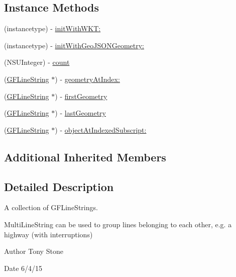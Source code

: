 \subsection*{Instance Methods}
\begin{DoxyCompactItemize}
\item 
(instancetype) -\/ \hyperlink{interface_g_f_multi_line_string_a23cca8dc30634c3ac23c8cfaca41c569}{init\+With\+W\+K\+T\+:}
\item 
(instancetype) -\/ \hyperlink{interface_g_f_multi_line_string_a35fba00c08f785e70b47dda5067f84f8}{init\+With\+Geo\+J\+S\+O\+N\+Geometry\+:}
\item 
(N\+S\+U\+Integer) -\/ \hyperlink{interface_g_f_multi_line_string_a49494350a429df86186d111b5496d66c}{count}
\item 
(\hyperlink{interface_g_f_line_string}{G\+F\+Line\+String} $\ast$) -\/ \hyperlink{interface_g_f_multi_line_string_a6724df65ee49b15e8778f965d3498bcb}{geometry\+At\+Index\+:}
\item 
(\hyperlink{interface_g_f_line_string}{G\+F\+Line\+String} $\ast$) -\/ \hyperlink{interface_g_f_multi_line_string_a78586818fa6ddbce9c3cf2032eba7f2d}{first\+Geometry}
\item 
(\hyperlink{interface_g_f_line_string}{G\+F\+Line\+String} $\ast$) -\/ \hyperlink{interface_g_f_multi_line_string_a807c900c20062193febb780e4ecc6abd}{last\+Geometry}
\item 
(\hyperlink{interface_g_f_line_string}{G\+F\+Line\+String} $\ast$) -\/ \hyperlink{interface_g_f_multi_line_string_a00496d2af8be614fe4cc11c6a6347591}{object\+At\+Indexed\+Subscript\+:}
\end{DoxyCompactItemize}
\subsection*{Additional Inherited Members}


\subsection{Detailed Description}
A collection of G\+F\+Line\+Strings. 

Multi\+Line\+String can be used to group lines belonging to each other, e.\+g. a highway (with interruptions)

\begin{DoxyAuthor}{Author}
Tony Stone 
\end{DoxyAuthor}
\begin{DoxyDate}{Date}
6/4/15 
\end{DoxyDate}


